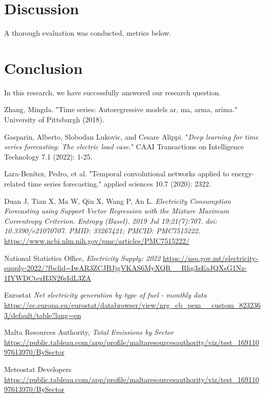 \documentclass{ieeeaccess}
\begin{document}
\section{Discussion}
A thorough evaluation was conducted, metrics below. 


\section{Conclusion}
In this research, we have successfully answered our research question.

\newpage
\begin{thebibliography}{00}

Zhang, Mingda. "Time series: Autoregressive models ar, ma, arma, arima." University of Pittsburgh (2018).

Gasparin, Alberto, Slobodan Lukovic, and Cesare Alippi. "\emph{Deep learning for time series forecasting: The electric load case.}" CAAI Transactions on Intelligence Technology 7.1 (2022): 1-25.

Lara-Benítez, Pedro, et al. "Temporal convolutional networks applied to energy-related time series forecasting." applied sciences 10.7 (2020): 2322.

 Duan J, Tian X, Ma W, Qiu X, Wang P, An L. \emph{Electricity Consumption Forecasting using Support Vector Regression with the Mixture Maximum Correntropy Criterion. Entropy (Basel). 2019 Jul 19;21(7):707. doi: 10.3390/e21070707. PMID: 33267421; PMCID: PMC7515222. }\url{https://www.ncbi.nlm.nih.gov/pmc/articles/PMC7515222/}

 National Statistics Office, \emph{Electricity Supply: 2022} \url{https://nso.gov.mt/electricity-supply-2022/?fbclid=IwAR3ZCJBJjgVKAS6MyXQR__Rhg3zEaJQXsG1Nz-1IYWDCtezH3N26rIdL3ZA}

 Eurostat \emph{Net electricity generation by type of fuel - monthly data} \url{https://ec.europa.eu/eurostat/databrowser/view/nrg_cb_pem__custom_8232363/default/table?lang=en}

 Malta Resources Authority, \emph{Total Emissions by Sector} \url{https://public.tableau.com/app/profile/maltaresourcesauthority/viz/test_16911097613970/BySector}

 Meteostat Developers \url{https://public.tableau.com/app/profile/maltaresourcesauthority/viz/test_16911097613970/BySector}


\end{thebibliography}
\end{document}
